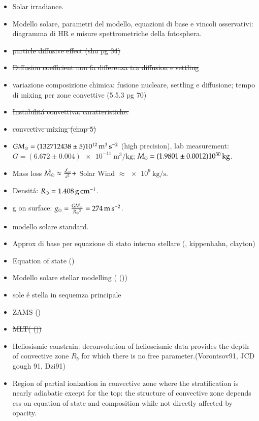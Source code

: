 \documentclass[oneside,12pt,fleqn]{memoir}
\begin{document}
{\begin{itemize}
Logaritmic abundances normalized to $n_H=\num{e12}$ particles per unit volume: $\log{A}=12+\frac{\log{n_i}}{\log{n_H}}$.
\item Solar irradiance.
\item Modello solare, parametri del modello, equazioni di base e vincoli osservativi: diagramma di HR e misure spettrometriche della fotosphera.
\item \sout{particle diffusive effect (shu pg 34)}
\item \sout{Diffusion coefficient non fa differenza tra diffusion e settling}
\item variazione composizione chimica: fusione nucleare, settling e diffusione; tempo di mixing per zone convettive (5.5.3 pg 70)
\item \sout{Instabilit\'a convettiva: caratteristiche.}
\item \sout{convective mixing (chap 5)}
\item $GM_{\odot}{}=(132712438\pm5)\SI{e12}{\cubic\meter\per\square\second}$ (high precision), lab measurement: $G=(6.672\pm0.004)\SI{e-11}{\cubic\meter\per\kilo\gram}$; $M_{\odot}{}=(1.9801\pm0.0012)\SI{e30}{\kilo\gram}$.
\item Mass loss $\dot{M_{\odot}{}}\approx\frac{\mathcal{L}_{\odot}{}}{c^2}+$ Solar Wind $\approx\SI{e9}{\kilo\gram\per\second}$.
\item Densit\'a: $\rsun{}=\SI{1.408}{\gram\per\cm}$.
\item g on surface: $g_{\odot}=\frac{GM_{\odot}}{R_{\odot}{}^2}=\SI{274}{\meter\per\square\second}$.
\item modello solare standard.
\item Approx di base per equazione di stato interno stellare (\sch{}, kippenhahn, clayton)
\item Equation of state (\cite{han12stellar})
\item Modello solare stellar modelling ( (\cite{han12stellar}))
\item sole \'e stella in sequemza principale
\item ZAMS (\cite{han12stellar})
\item \sout{MLT( (\cite{han12stellar}))}
\item Heliosismic constrain: deconvolution of helioseismic data provides the depth of convective zone $R_b$ for which there is no free parameter.(Vorontsov91, JCD gough 91, Dzi91)
\item Region of partial ionization in convective zone where the stratification is nearly adiabatic except for the top: the structure of convective zone depends ess on equation of state  and composition while not directly affected by opacity.

\end{itemize}}
\end{document}

